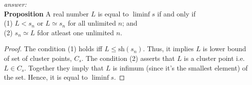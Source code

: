 \documentclass[a4paper, 11pt]{book}
\theoremstyle{plain}
\newenvironment{answer}
    {\textit{answer:}}
    {}
\theoremstyle{plain}
\newcommand{\sh}{\text{sh}}
\begin{document}
  \begin{answer} $ $ \\
    \textbf{Proposition} A real number $L$ is equal to $\liminf s$ if and only if \\
    (1) $L<s_n$ or $L \simeq s_n$ for all unlimited $n$; and \\
    (2) $s_n \simeq L$ fdor atleast one unlimited $n$. \\
  \begin{proof} 
    The condition (1) holds iff $L \leq \sh(s_n)$. Thus, it implies $L$ is lower bound of set of cluster points, $C_s$. The condition (2) asserts that $L$ is a cluster point i.e. $L \in C_s$. Together they imply that $L$ is infimum (since it's the smallest element) of the set. Hence, it is equal to $\liminf s$.  
  \end{proof}
  \end{answer}
  
\end{document}
